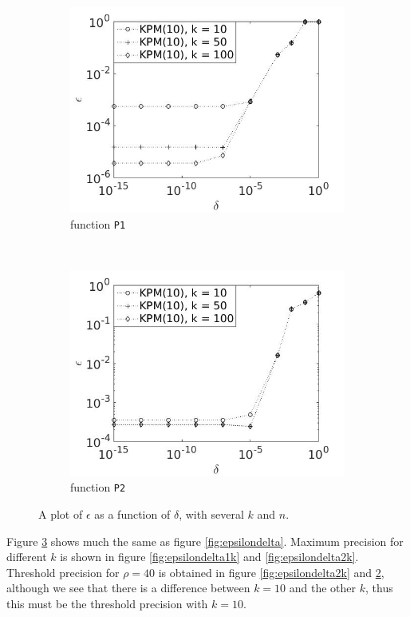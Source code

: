 \begin{figure}[H]
\begin{subfigure}[b]{0.45\textwidth}
                \includegraphics[width=\textwidth]{fig/s22errvstol1k10}
                \caption{function \texttt{P1}}
                \label{fig:epsilondelta3k}
        \end{subfigure}
~
        \begin{subfigure}[b]{0.45\textwidth}
                \includegraphics[width=\textwidth]{fig/s23errvstol2k10}
                \caption{ function \texttt{P2}}
                \label{fig:epsilondelta4k}
        \end{subfigure}
        \caption{A plot of $\epsilon$ as a function of $\delta$, with several $k$ and $n$.} \label{fig:epsilondeltak}
\end{figure}
Figure \ref{fig:epsilondeltak} shows much the same as figure \ref{fig:epsilondelta}. Maximum precision for different $k$ is shown in figure \ref{fig:epsilondelta1k} and \ref{fig:epsilondelta2k}.
Threshold precision for $\rho = 40$ is obtained in figure \ref{fig:epsilondelta2k} and \ref{fig:epsilondelta4k}, although we see that there is a difference between $k = 10$ and the other $k$, thus this must be the threshold precision with $k=10$. \\

